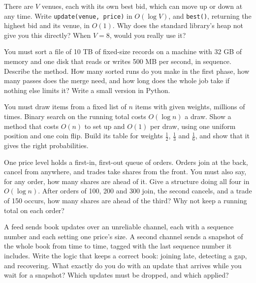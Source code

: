 \begin{question}\label{iq:iv3:algorithms:63}
There are $V$ venues, each with its own best bid, which can move up or down at any time. Write \texttt{update(venue, price)} in $O(\log V)$, and \texttt{best()}, returning the highest bid and its venue, in $O(1)$. Why does the standard library's heap not give you this directly? When $V = 8$, would you really use it?
\end{question}

\begin{question}\label{iq:iv3:algorithms:64}
You must sort a file of 10 TB of fixed-size records on a machine with 32 GB of memory and one disk that reads or writes 500 MB per second, in sequence. Describe the method. How many sorted runs do you make in the first phase, how many passes does the merge need, and how long does the whole job take if nothing else limits it? Write a small version in Python.
\end{question}

\begin{question}\label{iq:iv3:algorithms:65}
You must draw items from a fixed list of $n$ items with given weights, millions of times. Binary search on the running total costs $O(\log n)$ a draw. Show a method that costs $O(n)$ to set up and $O(1)$ per draw, using one uniform position and one coin flip. Build its table for weights $\frac{1}{2}$, $\frac{1}{3}$ and $\frac{1}{6}$, and show that it gives the right probabilities.
\end{question}

\begin{question}\label{iq:iv3:algorithms:66}
One price level holds a first-in, first-out queue of orders. Orders join at the back, cancel from anywhere, and trades take shares from the front. You must also say, for any order, how many shares are ahead of it. Give a structure doing all four in $O(\log n)$. After orders of 100, 200 and 300 join, the second cancels, and a trade of 150 occurs, how many shares are ahead of the third? Why not keep a running total on each order?
\end{question}

\begin{question}\label{iq:iv3:algorithms:67}
A feed sends book updates over an unreliable channel, each with a sequence number and each setting one price's size. A second channel sends a snapshot of the whole book from time to time, tagged with the last sequence number it includes. Write the logic that keeps a correct book: joining late, detecting a gap, and recovering. What exactly do you do with an update that arrives while you wait for a snapshot? Which updates must be dropped, and which applied?
\end{question}


